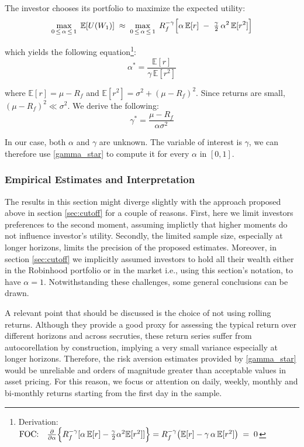 The investor chooses its portfolio to maximize the expected utility:
\begin{equation}
    \max_{0 \,\le\, \alpha \,\le\, 1}\; \mathbb{E}[U(W_1)]
    \;\approx\;
    \max_{0 \,\le\, \alpha \,\le\, 1}\;
    R_f^{-\gamma}\Bigl[\alpha\,\mathbb{E}[r]\;-\;\tfrac{\gamma}{2}\,\alpha^2\,\mathbb{E}[r^2]\Bigr]
\end{equation}

which yields the following equation\footnote{
    Derivation:
    $\text{FOC:}\quad
    \frac{\partial}{\partial \alpha}\Bigl\{R_f^{-\gamma}[\alpha\,\mathbb{E}[r]-\tfrac{\gamma}{2}\alpha^2\mathbb{E}[r^2]]\Bigr\}
    =
    R_f^{-\gamma}\bigl(\mathbb{E}[r]-\gamma\,\alpha\,\mathbb{E}[r^2]\bigr)
    \;=\;0$}:
\begin{equation}
    \alpha^*=
    \frac{\mathbb{E}[r]}{\gamma\,\mathbb{E}[r^2]}
\end{equation}

where $\mathbb{E}[r]=\mu-R_f$ and $\mathbb{E}[r^2]=\sigma^2+(\mu-R_f)^2$. 
Since returns are small, $(\mu-R_f)^2\ll\sigma^2$. We derive the following:
\begin{equation}
    \gamma^* = \frac{\mu-R_f}{\alpha \sigma^2}
    \label{gamma_star}
\end{equation}

In our case, both $\alpha$ and $\gamma$ are unknown. 
The variable of interest is $\gamma$, we can therefore use \ref{gamma_star} to compute it for every $\alpha$ in $[0,1]$. 


\subsubsection{Empirical Estimates and Interpretation}
\label{sec:gamma_estimates}
The results in this section might diverge slightly with the approach proposed above in section \ref{sec:cutoff} for a couple of reasons. 
First, here we limit investors preferences to the second moment, assuming implictly that higher moments do not influence investor's utility.
Secondly, the limited sample size, especially at longer horizons, limits the precision of the proposed estimates.
Moreover, in section \ref{sec:cutoff} we implicitly assumed investors to hold all their wealth either in the Robinhood portfolio or in the market i.e.,
using this section's notation, to have $\alpha=1$.
Notwithstanding these challenges, some general conclusions can be drawn. 

A relevant point that should be discussed is the choice of not using rolling returns. 
Although they provide a good proxy for assessing the typical return over different horizons and across secruties, 
these return series suffer from autocorellation by construction, implying a very small variance especially at longer horizons.
Therefore, the risk aversion estimates provided by \ref{gamma_star} would be unreliable and orders of magnitude greater than acceptable values in asset pricing.
For this reason, we focus or attention on daily, weekly, monthly and bi-monthly returns starting from the first day in the sample. 

